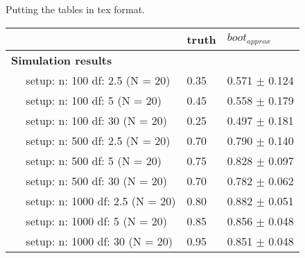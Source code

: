 \documentclass{article}
\begin{document}
Putting the tables in tex format.


\begin{tabular}{l|l|l}
    \hline
     & truth & $boot_{approx}$\\
    \hline
    \bf{Simulation results} & ~ & ~\\
    \hline
    ~~ setup: n: 100 df: 2.5 (N = 20) & 0.35 & 0.571 $\pm$ 0.124\\
    \hline
    ~~ setup: n: 100 df: 5 (N = 20) & 0.45 & 0.558 $\pm$ 0.179\\
    \hline
    ~~ setup: n: 100 df: 30 (N = 20) & 0.25 & 0.497 $\pm$ 0.181\\
    \hline
    ~~ setup: n: 500 df: 2.5 (N = 20) & 0.70 & 0.790 $\pm$ 0.140\\
    \hline
    ~~ setup: n: 500 df: 5 (N = 20) & 0.75 & 0.828 $\pm$ 0.097\\
    \hline
    ~~ setup: n: 500 df: 30 (N = 20) & 0.70 & 0.782 $\pm$ 0.062\\
    \hline
    ~~ setup: n: 1000 df: 2.5 (N = 20) & 0.80 & 0.882 $\pm$ 0.051\\
    \hline
    ~~ setup: n: 1000 df: 5 (N = 20) & 0.85 & 0.856 $\pm$ 0.048\\
    \hline
    ~~ setup: n: 1000 df: 30 (N = 20) & 0.95 & 0.851 $\pm$ 0.048\\
    \hline
    \end{tabular}
\end{document}
